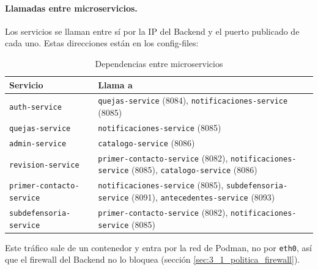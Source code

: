 \paragraph{Llamadas entre microservicios.} Los servicios se llaman entre sí por la IP del Backend y el puerto publicado de cada uno. Estas direcciones están en los config-files:
\begin{table}[H]
\centering
\caption{Dependencias entre microservicios}
\small
\begin{tabular}{p{4.2cm}p{10.2cm}}
\toprule
\textbf{Servicio} & \textbf{Llama a} \\
\midrule
\texttt{auth-service} & \texttt{quejas-service} (8084), \texttt{notificaciones-service} (8085) \\
\texttt{quejas-service} & \texttt{notificaciones-service} (8085) \\
\texttt{admin-service} & \texttt{catalogo-service} (8086) \\
\texttt{revision-service} & \texttt{primer-contacto-service} (8082), \texttt{notificaciones-service} (8085), \texttt{catalogo-service} (8086) \\
\texttt{primer-contacto-service} & \texttt{notificaciones-service} (8085), \texttt{subdefensoria-service} (8091), \texttt{antecedentes-service} (8093) \\
\texttt{subdefensoria-service} & \texttt{primer-contacto-service} (8082), \texttt{notificaciones-service} (8085) \\
\bottomrule
\end{tabular}
\end{table}
Este tráfico sale de un contenedor y entra por la red de Podman, no por \texttt{eth0}, así que el firewall del Backend no lo bloquea (sección \ref{sec:3_1_politica_firewall}).
